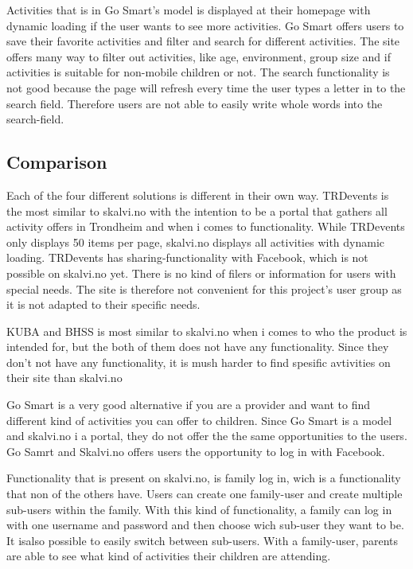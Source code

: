 Activities that is in Go Smart's model is displayed at their homepage with dynamic loading if the user wants to see more activities. Go Smart offers users to save their favorite activities and filter and search for different activities. The site offers many way to filter out activities, like age, environment, group size and if activities is suitable for non-mobile children or not. The search functionality is not good because the page will refresh every time the user types a letter in to the search field. Therefore users are not able to easily write whole words into the search-field. 

\subsection{Comparison}
Each of the four different solutions is different in their own way. TRDevents is the most similar to skalvi.no with the intention to be a portal that gathers all activity offers in Trondheim and when i comes to functionality. While TRDevents only displays 50 items per page, skalvi.no displays all activities with dynamic loading. TRDevents has sharing-functionality with Facebook, which is not possible on skalvi.no yet. There is no kind of filers or information for users with special needs. The site is therefore not convenient for this project's user group as it is not adapted to their specific needs. 

KUBA and BHSS is most similar to skalvi.no when i comes to who the product is intended for, but the both of them does not have any functionality. Since they don't not have any functionality, it is mush harder to find spesific avtivities on their site than skalvi.no

Go Smart is a very good alternative if you are a provider and want to find different kind of activities you can offer to children. Since Go Smart is a model and skalvi.no i a portal, they do not offer the the same opportunities to the users. Go Samrt and Skalvi.no offers users the opportunity to log in with Facebook.


Functionality that is present on skalvi.no, is family log in, wich is a functionality that non of the others have. Users can create one family-user and create multiple sub-users within the family. With this kind of functionality, a family can log in with one username and password and then choose wich sub-user they want to be. It isalso possible to easily switch between sub-users. With a family-user, parents are able to see what kind of activities their children are attending.


